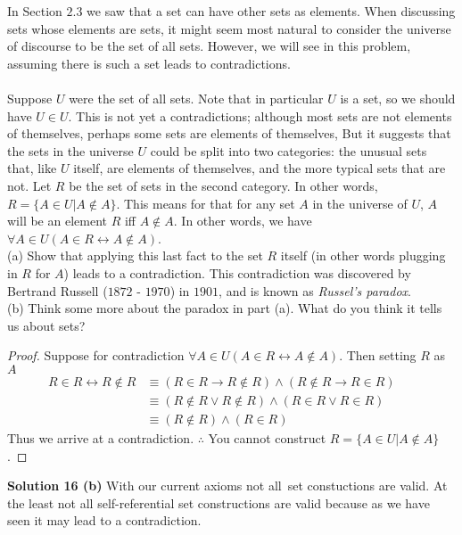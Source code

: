 \begin{tcolorbox}[title=Problem 16, breakable]
    In Section $2.3$ we saw that a set can have other sets as elements. When discussing sets
    whose elements are sets, it might seem most natural to consider the universe of discourse
    to be the set of all sets. However, we will see in this problem, assuming there is such a
    set leads to contradictions. \\ \\
    Suppose $U$ were the set of all sets. Note that in particular $U$ is a set, so we should have 
    $U \in U$. This is not yet a contradictions; although most sets are not elements of themselves,
    perhaps some sets are elements of themselves, But it suggests that the sets in the universe 
    $U$ could be split into two categories: the unusual sets that, like $U$ itself, are elements of
    themselves, and the more typical sets that are not. Let $R$ be the set of sets in the second 
    category. In other words, $R = \{A \in U | A \not \in A\}$. This means for that for any set 
    $A$ in the universe of $U$, $A$ will be an element $R$ iff $A \not \in A$. In other words,
    we have $\forall{A} \in U (A \in R \leftrightarrow A \not \in A)$. \\
    (a) Show that applying this last fact to the set $R$ itself (in other words plugging in $R$ for $A$)
        leads to a contradiction. This contradiction was discovered by Bertrand Russell ($1872$ - $1970$)
        in $1901$, and is known as \emph{Russel's paradox}. \\
    (b) Think some more about the paradox in part (a). What do you think it tells us about sets?
\end{tcolorbox}

\begin{proof}
    Suppose for contradiction $\forall{A} \in U (A \in R \leftrightarrow A \not \in A)$.
    Then setting $R$ as $A$
    \begin{align*}
        R \in R \leftrightarrow R \not \in R
            &\equiv (R \in R \rightarrow R \not \in R) \wedge (R \not \in R \rightarrow R \in R) && \\
            &\equiv (R \not \in R \vee R \not \in R) \wedge (R \in R \vee R \in R) && \\
            &\equiv (R \not \in R) \wedge (R \in R)
    \end{align*}
    Thus we arrive at a contradiction. $\therefore$ You cannot construct $R = \{A \in U | A \not \in A\}$.
\end{proof}

\textbf{Solution 16 (b)}
With our current axioms not all\ set constuctions are valid. At the least not all self-referential
set constructions are valid because as we have seen it may lead to a contradiction.

